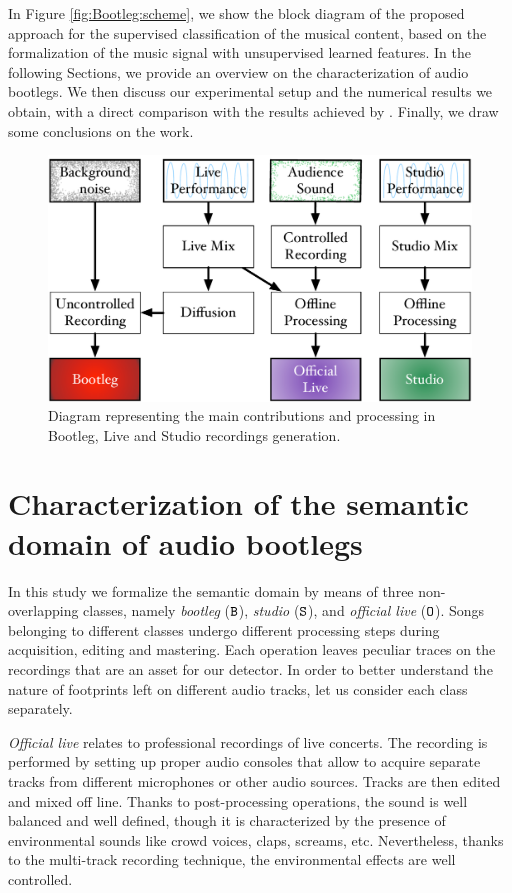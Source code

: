 In Figure \ref{fig:Bootleg:scheme}, we show the block diagram of the proposed approach for the supervised classification of the musical content, based on the formalization of the music signal with unsupervised learned features. In the following Sections, we provide an overview on the characterization of audio bootlegs. We then discuss our experimental setup and the numerical results we obtain, with a direct comparison with the results achieved by \cite{Bestagini2013b}. Finally, we draw some conclusions on the work.

\begin{figure}[t]
\centering
\includegraphics[width=1\columnwidth]{img/Bootleg/paolo_figu}
\caption{Diagram representing the main contributions and processing in Bootleg, Live and Studio recordings generation.}
\label{fig:Bootleg:schema}
\end{figure}
\section{Characterization of the semantic domain of audio bootlegs}\label{sec:Bootleg:overview}
In this study we formalize the semantic domain by means of three non-overlapping classes, namely \textit{bootleg} ($\B$), \textit{studio} ($\S$), and \textit{official live} ($\O$). Songs belonging to different classes undergo different processing steps during acquisition, editing and mastering. Each operation leaves peculiar traces on the recordings that are an asset for our detector. In order to better understand the nature of footprints left on different audio tracks, let us consider each class separately.  

\textit{Official live} relates to professional recordings of live concerts. The recording is performed by setting up proper audio consoles that allow to acquire separate tracks from different microphones or other audio sources. Tracks are then edited and mixed off line. 
Thanks to post-processing operations, the sound is well balanced and well defined, though it is characterized by the presence of environmental sounds like crowd voices, claps, screams, etc. Nevertheless, thanks to the multi-track recording technique, the environmental effects are well controlled. 

